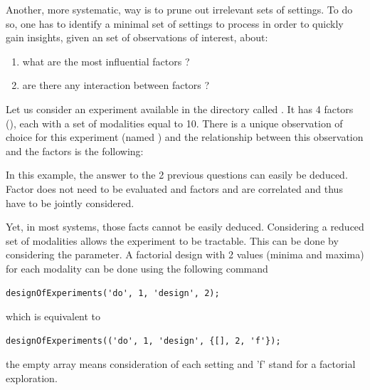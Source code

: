 \documentclass[a4paper,fleqn]{tufte-handout}
\begin{document}
Another, more systematic, way is to prune out irrelevant sets of settings. To do so, one has to identify a minimal set of settings to process in order to quickly gain insights, given an set of observations of interest, about:
\begin{enumerate}
\item what are the most influential factors ?
\item are there any interaction between factors ?
\end{enumerate}

Let us consider an experiment available in the  directory called . It has 4 factors (), each with a set of modalities equal to 10. There is a unique observation  of choice for this experiment (named ) and the relationship between this observation and the factors is the following:



In this example, the answer  to the 2 previous questions can easily be deduced. Factor  does not need to be evaluated and factors  and  are correlated and thus have to be jointly considered.

Yet, in most systems, those facts cannot be easily deduced. Considering a reduced set of modalities allows the experiment to be tractable. This can be done by considering the  parameter. A factorial design with 2 values (minima and maxima) for each modality can be done using the following command

\begin{lstlisting}
designOfExperiments('do', 1, 'design', 2);
\end{lstlisting}

which is equivalent to
\begin{lstlisting}
designOfExperiments(('do', 1, 'design', {[], 2, 'f'});
\end{lstlisting}

the empty array means consideration of each setting and 'f' stand for a factorial exploration.
\end{document}
